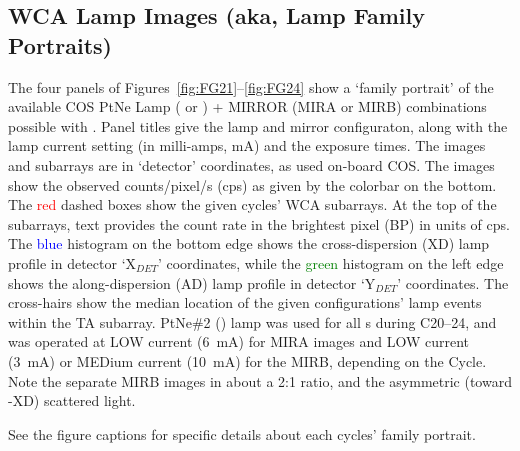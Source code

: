 \subsection{WCA Lamp Images (aka, Lamp Family Portraits) \label{subsec:fportrait} }
\normalsize

The four panels of Figures~\ref{fig:FG21}--\ref{fig:FG24} show a `family portrait' of the available COS PtNe Lamp (\plampone{} or \plamptwo{}) + MIRROR (MIRA or MIRB)
combinations possible with .
Panel titles give the lamp and mirror configuraton, along with the lamp current setting (in milli-amps, mA) and the exposure times.
The images and subarrays are in `detector' coordinates, as used on-board COS.
The images show the observed counts/pixel/s (cps) as given by the colorbar on the bottom.
The \textcolor{red}{red} dashed boxes show the given cycles'  WCA subarrays. At the top of the subarrays, text provides the count rate in the brightest pixel (BP) in units of cps.
The \textcolor{blue}{blue} histogram on the bottom edge shows the cross-dispersion (XD) lamp profile in detector `X$_{DET}$' coordinates, while
the \textcolor{green}{green} histogram on the left edge shows the along-dispersion (AD) lamp profile in detector `Y$_{DET}$' coordinates.
The cross-hairs show the median location of the given configurations' lamp events within the TA subarray.
PtNe\#2 (\plamptwo{}) lamp was used for all s during C20--24, and was operated at LOW current (6~mA) for MIRA images
and LOW current (3~mA) or MEDium current (10~mA) for the MIRB, depending on the Cycle. Note the separate MIRB images in about a 2:1 ratio, and the asymmetric
(toward -XD) scattered light.

See the figure captions for specific details about each cycles' family portrait.

